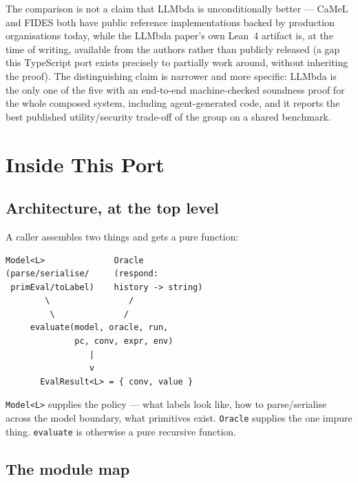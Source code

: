 \documentclass[11pt, a4paper]{article}
\begin{document}
\begin{descirption}
{The comparison is not a claim that LLMbda is unconditionally better ---
CaMeL and FIDES both have public reference implementations backed by
production organisations today, while the LLMbda paper's own Lean~4
artifact is, at the time of writing, available from the authors rather
than publicly released (a gap this TypeScript port exists precisely to
partially work around, without inheriting the proof). The distinguishing
claim is narrower and more specific: LLMbda is the only one of the five
with an end-to-end machine-checked soundness proof for the whole
composed system, including agent-generated code, and it reports the best
published utility/security trade-off of the group on a shared benchmark.

\section{Inside This Port}

\subsection{Architecture, at the top level}

A caller assembles two things and gets a pure function:

\begin{lstlisting}
Model<L>              Oracle
(parse/serialise/     (respond:
 primEval/toLabel)    history -> string)
        \                /
         \              /
     evaluate(model, oracle, run,
              pc, conv, expr, env)
                 |
                 v
       EvalResult<L> = { conv, value }
\end{lstlisting}

\lstinline{Model<L>} supplies the policy --- what labels look like, how to
parse/serialise across the model boundary, what primitives exist.
\lstinline{Oracle} supplies the one impure thing. \lstinline{evaluate} is
otherwise a pure recursive function.

\subsection{The module map}

}
\end{descirption}
\end{document}
